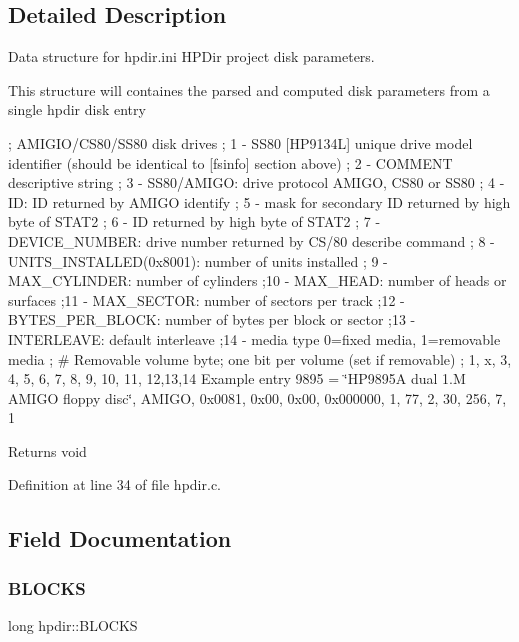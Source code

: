 \subsection{Detailed Description}
Data structure for hpdir.\+ini H\+P\+Dir project disk parameters. 

This structure will containes the parsed and computed disk parameters from a single hpdir disk entry

; A\+M\+I\+G\+I\+O/\+C\+S80/\+S\+S80 disk drives ; 1 -\/ S\+S80 \mbox{[}H\+P9134L\mbox{]} unique drive model identifier (should be identical to \mbox{[}fsinfo\mbox{]} section above) ; 2 -\/ C\+O\+M\+M\+E\+NT descriptive string ; 3 -\/ S\+S80/\+A\+M\+I\+GO\+: drive protocol A\+M\+I\+GO, C\+S80 or S\+S80 ; 4 -\/ ID\+: ID returned by A\+M\+I\+GO identify ; 5 -\/ mask for secondary ID returned by high byte of S\+T\+A\+T2 ; 6 -\/ ID returned by high byte of S\+T\+A\+T2 ; 7 -\/ D\+E\+V\+I\+C\+E\+\_\+\+N\+U\+M\+B\+ER\+: drive number returned by C\+S/80 describe command ; 8 -\/ U\+N\+I\+T\+S\+\_\+\+I\+N\+S\+T\+A\+L\+L\+E\+D(0x8001)\+: number of units installed ; 9 -\/ M\+A\+X\+\_\+\+C\+Y\+L\+I\+N\+D\+ER\+: number of cylinders ;10 -\/ M\+A\+X\+\_\+\+H\+E\+AD\+: number of heads or surfaces ;11 -\/ M\+A\+X\+\_\+\+S\+E\+C\+T\+OR\+: number of sectors per track ;12 -\/ B\+Y\+T\+E\+S\+\_\+\+P\+E\+R\+\_\+\+B\+L\+O\+CK\+: number of bytes per block or sector ;13 -\/ I\+N\+T\+E\+R\+L\+E\+A\+VE\+: default interleave ;14 -\/ media type 0=fixed media, 1=removable media ; \# Removable volume byte; one bit per volume (set if removable) ; 1, x, 3, 4, 5, 6, 7, 8, 9, 10, 11, 12,13,14 Example entry 9895 = \char`\"{}\+H\+P9895\+A dual 1.\+M A\+M\+I\+G\+O floppy disc\char`\"{}, A\+M\+I\+GO, 0x0081, 0x00, 0x00, 0x000000, 1, 77, 2, 30, 256, 7, 1

\begin{DoxyReturn}{Returns}
void 
\end{DoxyReturn}


Definition at line 34 of file hpdir.\+c.



\subsection{Field Documentation}
\mbox{\label{structhpdir_acf23c02ae0b762bebc9bea81618c4454}} 
\subsubsection{\texorpdfstring{B\+L\+O\+C\+KS}{BLOCKS}}
{\footnotesize\ttfamily long hpdir\+::\+B\+L\+O\+C\+KS}



